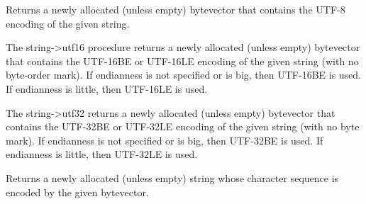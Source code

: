 \begin{entry}{%
}

Returns a newly allocated (unless empty) bytevector that
contains the UTF-8 encoding of the given string.
\end{entry}

\begin{entry}{%
}

  The {\cf string->utf16
  procedure} returns a newly allocated (unless empty) bytevector that
contains the UTF-16BE or UTF-16LE encoding of the given string (with
no byte-order mark).  If endianness is not specified or is {\cf big},
then UTF-16BE is used.  If endianness is {\cf little}, then UTF-16LE
is used.
\end{entry}

\begin{entry}{%
}

  The {\cf string->utf32} returns
a newly allocated (unless empty) bytevector that contains the UTF-32BE
or UTF-32LE encoding of the given string (with no byte mark).  If
endianness is not specified or is {\cf big}, then UTF-32BE is used.
If endianness is {\cf little}, then UTF-32LE is used.
\end{entry}

\begin{entry}{%
}

Returns a newly allocated (unless empty) string whose character
sequence is encoded by the given bytevector.
\end{entry}

